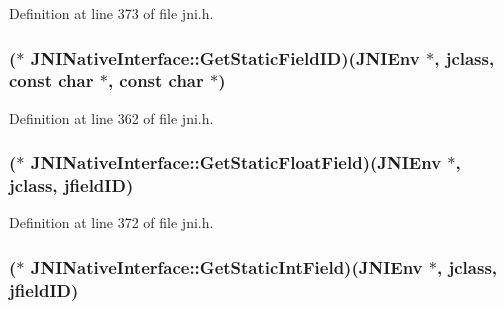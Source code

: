 Definition at line 373 of file jni.\-h.

\hypertarget{struct_j_n_i_native_interface_aabf674dad2a19113f135de6309c2648d}{
\subsubsection[{Get\-Static\-Field\-I\-D}]{($\ast$ J\-N\-I\-Native\-Interface\-::\-Get\-Static\-Field\-I\-D)({\bf J\-N\-I\-Env} $\ast$, {\bf jclass}, const char $\ast$, const char $\ast$)}}\label{struct_j_n_i_native_interface_aabf674dad2a19113f135de6309c2648d}


Definition at line 362 of file jni.\-h.

\hypertarget{struct_j_n_i_native_interface_ac6da8215db6adb9bbc019310b8e6de63}{
\subsubsection[{Get\-Static\-Float\-Field}]{($\ast$ J\-N\-I\-Native\-Interface\-::\-Get\-Static\-Float\-Field)({\bf J\-N\-I\-Env} $\ast$, {\bf jclass}, {\bf jfield\-I\-D})}}\label{struct_j_n_i_native_interface_ac6da8215db6adb9bbc019310b8e6de63}


Definition at line 372 of file jni.\-h.

\hypertarget{struct_j_n_i_native_interface_abefa9f1e96c426433abcae97454d9a10}{
\subsubsection[{Get\-Static\-Int\-Field}]{($\ast$ J\-N\-I\-Native\-Interface\-::\-Get\-Static\-Int\-Field)({\bf J\-N\-I\-Env} $\ast$, {\bf jclass}, {\bf jfield\-I\-D})}}\label{struct_j_n_i_native_interface_abefa9f1e96c426433abcae97454d9a10}


